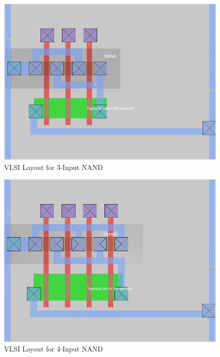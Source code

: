 \documentclass[12pt]{article}
\begin{document}
\begin{figure}[H]
	\centering
	\includegraphics[width=0.70\linewidth, keepaspectratio]{Graphics/3NAND}
	\caption{VLSI Layout for 3-Input NAND}
	\label{fig:magic_NAND3}
\end{figure}

\begin{figure}[H]
	\centering
	\includegraphics[width=0.70\linewidth, keepaspectratio]{Graphics/4NAND}
	\caption{VLSI Layout for 4-Input NAND}
	\label{fig:magic_NAND4}
\end{figure}
\end{document}
